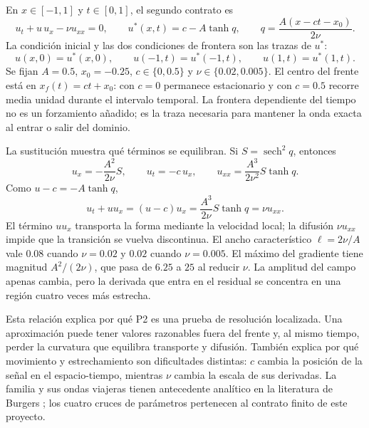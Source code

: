 En $x\in[-1,1]$ y $t\in[0,1]$, el segundo contrato es
\begin{equation}
u_t+u\,u_x-\nu u_{xx}=0,
\qquad
u^*(x,t)=c-A\tanh q,
\qquad
q=\frac{A(x-ct-x_0)}{2\nu}.
\label{eq:expansion-p2-burgers}
\end{equation}
La condición inicial y las dos condiciones de frontera son las trazas de
$u^*$:
\begin{equation}
u(x,0)=u^*(x,0),
\qquad
u(-1,t)=u^*(-1,t),
\qquad
u(1,t)=u^*(1,t).
\label{eq:expansion-p2-conditions}
\end{equation}
Se fijan $A=0.5$, $x_0=-0.25$,
$c\in\{0,0.5\}$ y $\nu\in\{0.02,0.005\}$. El centro del frente está en
$x_f(t)=ct+x_0$: con $c=0$ permanece estacionario y con $c=0.5$ recorre
media unidad durante el intervalo temporal. La frontera dependiente del
tiempo no es un forzamiento añadido; es la traza necesaria para mantener la
onda exacta al entrar o salir del dominio.

La sustitución muestra qué términos se equilibran. Si
$S=\operatorname{sech}^2q$, entonces
\begin{equation}
u_x=-\frac{A^2}{2\nu}S,
\qquad
u_t=-c\,u_x,
\qquad
u_{xx}=\frac{A^3}{2\nu^2}S\tanh q.
\label{eq:expansion-p2-derivatives}
\end{equation}
Como $u-c=-A\tanh q$,
\begin{equation}
u_t+u u_x=(u-c)u_x
 =\frac{A^3}{2\nu}S\tanh q
 =\nu u_{xx}.
\label{eq:expansion-p2-balance}
\end{equation}
El término $u u_x$ transporta la forma mediante la velocidad local; la
difusión $\nu u_{xx}$ impide que la transición se vuelva discontinua. El
ancho característico $\ell=2\nu/A$ vale $0.08$ cuando $\nu=0.02$ y
$0.02$ cuando $\nu=0.005$. El máximo del gradiente tiene magnitud
$A^2/(2\nu)$, que pasa de $6.25$ a $25$ al reducir $\nu$. La amplitud del
campo apenas cambia, pero la derivada que entra en el residual se concentra
en una región cuatro veces más estrecha.

Esta relación explica por qué P2 es una prueba de resolución localizada. Una
aproximación puede tener valores razonables fuera del frente y, al mismo
tiempo, perder la curvatura que equilibra transporte y difusión. También
explica por qué movimiento y estrechamiento son dificultades distintas: $c$
cambia la posición de la señal en el espacio-tiempo, mientras $\nu$ cambia
la escala de sus derivadas. La familia y sus ondas viajeras tienen antecedente
analítico en la literatura de Burgers \cite{burgerswaves2025}; los cuatro
cruces de parámetros pertenecen al contrato finito de este proyecto.

